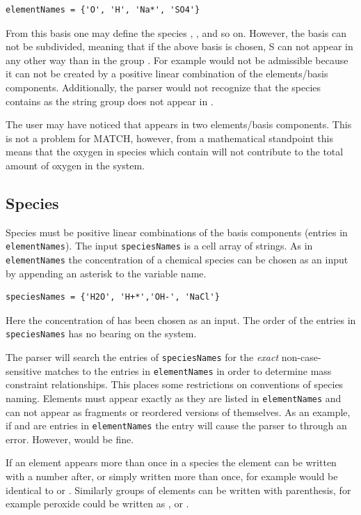 \documentclass{article}
\begin{document}
\begin{lstlisting}
elementNames = {'O', 'H', 'Na*', 'SO4'}
\end{lstlisting}

From this basis one may define the species , ,  and so on. However, the basis can not be subdivided, meaning that if the above basis is chosen, S can not appear in any other way than in the group . For example  would not be admissible because it can not be created by a positive linear combination of the elements/basis components. Additionally, the parser would not recognize that the species  contains  as the string group  does not appear in .

The user may have noticed that  appears in two elements/basis components. This is not a problem for MATCH, however, from a mathematical standpoint this means that the oxygen in species which contain  will not contribute to the total amount of oxygen in the system. 

\subsection{Species}
Species must be positive linear combinations of the basis components (entries in \verb|elementNames|). The input \verb|speciesNames| is a cell array of strings. As in \verb|elementNames| the concentration of a chemical species can be chosen as an input by appending an asterisk to the variable name.

\begin{lstlisting}
speciesNames = {'H2O', 'H+*','OH-', 'NaCl'}
\end{lstlisting}
Here the concentration of  has been chosen as an input.  The order of the entries in \verb|speciesNames| has no bearing on the system.

The parser will search the entries of \verb|speciesNames| for the \emph{exact} non-case-sensitive matches to the entries in \verb|elementNames| in order to determine mass constraint relationships. This places some restrictions on conventions of species naming. Elements must appear exactly as they are listed in \verb|elementNames| and can not appear as fragments or reordered versions of themselves. As an example, if  and  are entries in \verb|elementNames| the entry  will cause the parser to through an error. However,  would be fine. 

If an element appears more than once in a species the element can be written with a number after, or simply written more than once, for example  would be identical to  or . Similarly groups of elements can be written with parenthesis, for example peroxide could be written as ,  or . 
\end{document}
